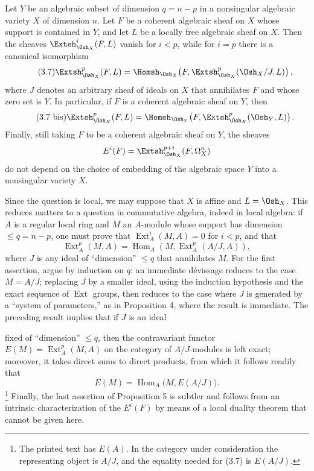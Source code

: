  Let $Y$ be an algebraic subset of dimension $q=n-p$ in
a nonsingular algebraic variety $X$ of dimension $n$. Let $F$ be a coherent
algebraic sheaf on $X$ whose support is contained in $Y$, and let $L$ be a
locally free algebraic sheaf on $X$. Then the sheaves
$\Extsh_{\Osh_X}^{i}(F,L)$ vanish for $i<p$, while for $i=p$ there is a canonical
isomorphism
\begin{equation}\tag{3.7}
  \Extsh_{\Osh_X}^{p}(F,L)
  =\Homsh_{\Osh_X}\!\left(F,
  \Extsh_{\Osh_X}^{p}(\Osh_X/J,L)\right),
\end{equation}
where $J$ denotes an arbitrary sheaf of ideals on $X$ that annihilates $F$ and
whose zero set is $Y$. In particular, if $F$ is a coherent algebraic sheaf on
$Y$, then
\begin{equation}\tag{3.7 bis}
  \Extsh_{\Osh_X}^{p}(F,L)
  =\Homsh_{\Osh_Y}\!\left(F,\Extsh_{\Osh_X}^{p}(\Osh_Y,L)\right).
\end{equation}
Finally, still taking $F$ to be a coherent algebraic sheaf on $Y$, the sheaves
\[
  E^{i}(F)=\Extsh_{\Osh_X}^{p+i}(F,\Omega_X^{n})
\]
do not depend on the choice of embedding of the algebraic space $Y$ into a
nonsingular variety $X$.

Since the question is local, we may suppose that $X$ is affine and
$L=\Osh_X$. This reduces matters to a question in commutative algebra, indeed in
local algebra: if $A$ is a regular local ring and $M$ an $A$-module whose
support has dimension $\leq q=n-p$, one must prove that
$\operatorname{Ext}_{A}^{i}(M,A)=0$ for $i<p$, and that
\[
  \operatorname{Ext}_{A}^{p}(M,A)
  =\operatorname{Hom}_{A}\!\left(M,\operatorname{Ext}_{A}^{p}(A/J,A)\right),
\]
where $J$ is any ideal of “dimension” $\leq q$ that annihilates $M$. For the
first assertion, argue by induction on $q$: an immediate dévissage reduces to
the case $M=A/J$; replacing $J$ by a smaller ideal, using the induction
hypothesis and the exact sequence of $\operatorname{Ext}$ groups, then reduces
to the case where $J$ is generated by a “system of parameters,” as in
Proposition 4, where the result is immediate. The preceding result implies that
if $J$ is an ideal

fixed of “dimension” $\leq q$, then the contravariant functor
$E(M)=\operatorname{Ext}_{A}^{p}(M,A)$ on the category of $A/J$-modules is left
exact; moreover, it takes direct sums to direct products, from which it follows
readily that
\[
  E(M)=\operatorname{Hom}_{A}\bigl(M,E(A/J)\bigr).
\]
\footnote{The printed text has $E(A)$. In the category under consideration the
representing object is $A/J$, and the equality needed for (3.7) is $E(A/J)$.}
Finally, the last assertion of Proposition 5 is subtler and follows from an
intrinsic characterization of the $E^{i}(F)$ by means of a local duality theorem
that cannot be given here.

